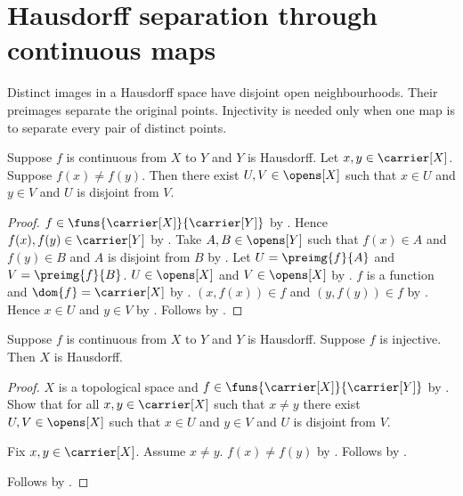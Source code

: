\section{Hausdorff separation through continuous maps}




Distinct images in a Hausdorff space have disjoint open neighbourhoods.
Their preimages separate the original points. Injectivity is needed only
when one map is to separate every pair of distinct points.

\begin{theorem}\label{continuous_map_separates_points}
    Suppose $f$ is continuous from $X$ to $Y$ and $Y$ is Hausdorff.
    Let $x,y\in\carrier[X]$.
    Suppose $f(x)\neq f(y)$.
    Then there exist $U,V\in\opens[X]$ such that
        $x\in U$ and $y\in V$ and $U$ is disjoint from $V$.
\end{theorem}
\begin{proof}
    $f\in\funs{\carrier[X]}{\carrier[Y]}$ by .
    Hence $f(x),f(y)\in\carrier[Y]$ by .
    Take $A,B\in\opens[Y]$ such that
        $f(x)\in A$ and $f(y)\in B$ and $A$ is disjoint from $B$ by
        .
    Let $U=\preimg{f}{A}$ and $V=\preimg{f}{B}$.
    $U\in\opens[X]$ and $V\in\opens[X]$ by .
    $f$ is a function and $\dom{f}=\carrier[X]$ by .
    $(x,f(x))\in f$ and $(y,f(y))\in f$ by .
    Hence $x\in U$ and $y\in V$ by .
    Follows by .
\end{proof}

\begin{theorem}\label{continuous_injection_into_hausdorff}
    Suppose $f$ is continuous from $X$ to $Y$ and $Y$ is Hausdorff.
    Suppose $f$ is injective.
    Then $X$ is Hausdorff.
\end{theorem}
\begin{proof}
    $X$ is a topological space and $f\in\funs{\carrier[X]}{\carrier[Y]}$ by
        .
    Show that for all $x,y\in\carrier[X]$ such that $x\neq y$ there exist
        $U,V\in\opens[X]$ such that $x\in U$ and $y\in V$ and $U$ is disjoint from $V$.
    \begin{subproof}
        Fix $x,y\in\carrier[X]$.
        Assume $x\neq y$.
        $f(x)\neq f(y)$ by .
        Follows by .
    \end{subproof}
    Follows by .
\end{proof}

